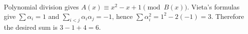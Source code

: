 Polynomial division gives $A(x)\equiv x^2-x+1\pmod{B(x)}$. Vieta's formulas give $\sum\alpha_i=1$ and $\sum_{i<j}\alpha_i\alpha_j=-1$, hence $\sum\alpha_i^2=1^2-2(-1)=3$. Therefore the desired sum is $3-1+4=\boxed6$.
